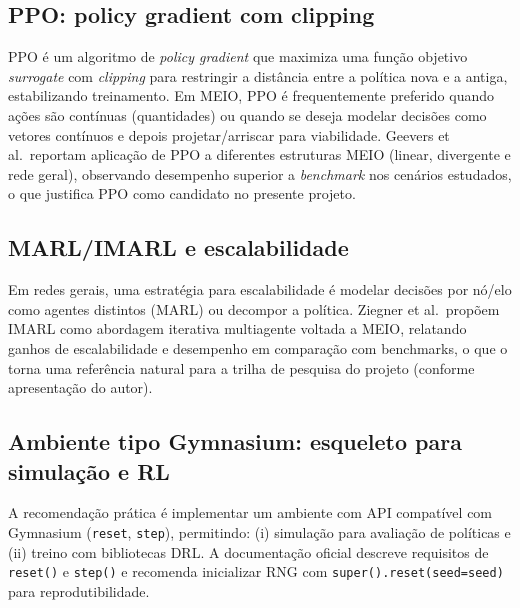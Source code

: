 \subsection{PPO: policy gradient com clipping}

PPO é um algoritmo de \emph{policy gradient} que maximiza uma função objetivo \emph{surrogate} com \emph{clipping} para restringir a distância entre a política nova e a antiga, estabilizando treinamento. \cite{Schulman2017PPO} Em MEIO, PPO é frequentemente preferido quando ações são contínuas (quantidades) ou quando se deseja modelar decisões como vetores contínuos e depois projetar/arriscar para viabilidade. Geevers et al.\ reportam aplicação de PPO a diferentes estruturas MEIO (linear, divergente e rede geral), observando desempenho superior a \emph{benchmark} nos cenários estudados, o que justifica PPO como candidato no presente projeto. \cite{Geevers2024MEIODRL}

\subsection{MARL/IMARL e escalabilidade}

Em redes gerais, uma estratégia para escalabilidade é modelar decisões por nó/elo como agentes distintos (MARL) ou decompor a política. Ziegner et al.\ propõem IMARL como abordagem iterativa multiagente voltada a MEIO, relatando ganhos de escalabilidade e desempenho em comparação com benchmarks, o que o torna uma referência natural para a trilha de pesquisa do projeto (conforme apresentação do autor). \cite{Ziegner2025IMARL}

\subsection{Ambiente tipo Gymnasium: esqueleto para simulação e RL}

A recomendação prática é implementar um ambiente com API compatível com Gymnasium (\texttt{reset}, \texttt{step}), permitindo: (i) simulação para avaliação de políticas e (ii) treino com bibliotecas DRL. A documentação oficial descreve requisitos de \texttt{reset()} e \texttt{step()} e recomenda inicializar RNG com \texttt{super().reset(seed=seed)} para reprodutibilidade. \cite{GymnasiumEnvAPI}

